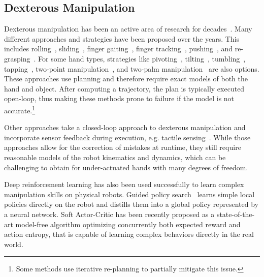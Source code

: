\subsection{Dexterous Manipulation}
Dexterous manipulation has been an active area of research for decades~\citep{DBLP:conf/icra/Fearing86, DBLP:journals/ijrr/Rus99,DBLP:journals/trob/Bicchi00, DBLP:conf/icra/OkamuraSC00, DBLP:conf/icar/MaD11}.
Many different approaches and strategies have been proposed over the years.
This includes rolling~\citep{DBLP:conf/icra/BicchiS95, DBLP:conf/icra/HanGLQT97, DBLP:conf/icra/HanT98, DBLP:journals/trob/CherifG99, DBLP:conf/icra/DoulgeriD13}, sliding~\citep{DBLP:journals/trob/CherifG99, DBLP:journals/trob/ShiWUL17}, finger gaiting~\citep{DBLP:conf/icra/HanT98}, finger tracking~\citep{DBLP:conf/icra/Rus92}, pushing~\citep{DBLP:journals/corr/DafleR17}, and re-grasping~\citep{DBLP:conf/icra/TournassoudLM87, DBLP:conf/icra/DafleRPTSEMLSF14}.
For some hand types, strategies like pivoting~\citep{DBLP:conf/iros/AiyamaII93}, tilting~\citep{DBLP:journals/trob/ErdmannM88}, tumbling~\citep{sawasaki1991tumbling}, tapping~\citep{DBLP:journals/ijrr/HuangM00}, two-point manipulation~\citep{DBLP:conf/iros/AbellE95}, and two-palm manipulation~\citep{DBLP:journals/ijrr/Erdmann98} are also options.
These approaches use planning and therefore require exact models of both the hand and object.
After computing a trajectory, the plan is typically executed open-loop, thus making these methods prone to failure if the model is not accurate.\footnote{Some methods use iterative re-planning to partially mitigate this issue.}

Other approaches take a closed-loop approach to dexterous manipulation and incorporate sensor feedback during execution, e.g. tactile sensing~\citep{DBLP:conf/icra/TaharaAY10, DBLP:conf/iros/LiBKB14, DBLP:conf/icra/LiYTB14, DBLP:journals/ijma/0001MHRB13}.
While those approaches allow for the correction of mistakes at runtime, they still require reasonable models of the robot kinematics and dynamics, which can be challenging to obtain for under-actuated hands with many degrees of freedom.

Deep reinforcement learning has also been used successfully to learn complex manipulation skills on physical robots.
Guided policy search~\citep{DBLP:conf/icml/LevineK13, DBLP:conf/icra/LevineWA15} learns simple local policies directly on the robot and distills them into a global policy represented by a neural network. Soft Actor-Critic\cite{DBLP:journals/corr/abs-1812-05905} has been recently proposed as a state-of-the-art model-free algorithm optimizing concurrently both expected reward and action entropy, that is capable of learning complex behaviors directly in the real world.

